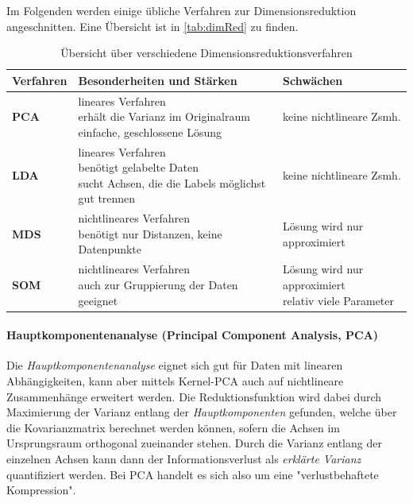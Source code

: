 			Im Folgenden werden einige übliche Verfahren zur Dimensionsreduktion angeschnitten. Eine Übersicht ist in \autoref{tab:dimRed} zu finden.

			\begin{table}
				\centering
				\begin{tabular}{l|ll}
					\toprule
					\textbf{Verfahren} & \textbf{Besonderheiten und Stärken}                                                                                     & \textbf{Schwächen}                                                           \\ \midrule
					\textbf{PCA}       & \multirowcell{3}[][l]{lineares Verfahren\\erhält die Varianz im Originalraum\\einfache, geschlossene Lösung}            & keine nichtlineare Zsmh.                                                     \\ \midrule
					\textbf{LDA}       & \multirowcell{3}[][l]{lineares Verfahren\\benötigt gelabelte Daten\\sucht Achsen, die die Labels möglichst gut trennen} & keine nichtlineare Zsmh.                                                     \\ \midrule
					\textbf{MDS}       & \multirowcell{3}[][l]{nichtlineares Verfahren\\benötigt nur Distanzen, keine Datenpunkte}                               & Lösung wird nur approximiert                                                 \\ \midrule
					\textbf{SOM}       & \multirowcell{2}[][l]{nichtlineares Verfahren\\auch zur Gruppierung der Daten geeignet}                                 & \multirowcell{2}[][l]{Lösung wird nur approximiert\\relativ viele Parameter} \\
					\bottomrule
				\end{tabular}
				\caption{Übersicht über verschiedene Dimensionsreduktionsverfahren}
				\label{tab:dimRed}
			\end{table}

			\paragraph{Hauptkomponentenanalyse (Principal Component Analysis, PCA)}
				Die \emph{Hauptkomponentenanalyse} eignet sich gut für Daten mit linearen Abhängigkeiten, kann aber mittels Kernel-PCA auch auf nichtlineare Zusammenhänge erweitert werden. Die Reduktionsfunktion wird dabei durch Maximierung der Varianz entlang der \emph{Hauptkomponenten} gefunden, welche über die Kovarianzmatrix berechnet werden können, sofern die Achsen im Ursprungsraum orthogonal zueinander stehen. Durch die Varianz entlang der einzelnen Achsen kann dann der Informationsverlust als \emph{erklärte Varianz} quantifiziert werden. Bei PCA handelt es sich also um eine "verlustbehaftete Kompression".

